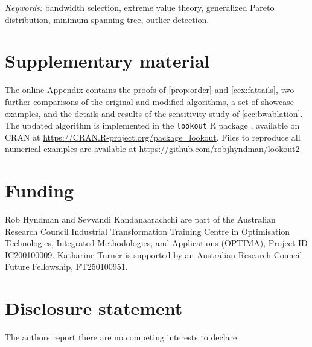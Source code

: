 \documentclass[12pt]{article}
\theoremstyle{plain}%
\theoremstyle{definition}
\def\spacingset#1{\renewcommand{\baselinestretch}%
{#1}\small\normalsize}
\begin{document}
\noindent%
\textit{Keywords:}
bandwidth selection,
extreme value theory,
generalized Pareto distribution,
minimum spanning tree,
outlier detection.

\newpage
\spacingset{1.8} %








\section*{Supplementary material}

The online Appendix contains the proofs of \cref{prop:order} and \cref{cex:fattails}, two further comparisons of the original and modified algorithms, a set of showcase examples, and the details and results of the sensitivity study of \cref{sec:bwablation}. The updated algorithm is implemented in the \texttt{lookout} R package \citep{Rlookout}, available on CRAN at \url{https://CRAN.R-project.org/package=lookout}. Files to reproduce all numerical examples are available at \url{https://github.com/robjhyndman/lookout2}.


\section*{Funding}

Rob Hyndman and Sevvandi Kandanaarachchi are part of the Australian Research Council Industrial Transformation Training Centre in Optimisation Technologies, Integrated Methodologies, and Applications (OPTIMA), Project ID IC200100009. Katharine Turner is supported by an Australian Research Council Future Fellowship, FT250100951.

\section*{Disclosure statement}

The authors report there are no competing interests to declare.


\end{document}
